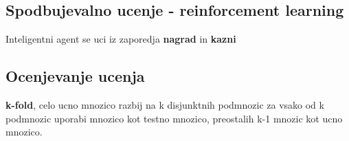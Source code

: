 \subsection{Spodbujevalno ucenje - reinforcement learning}
Inteligentni agent se uci iz zaporedja \textbf{nagrad} in \textbf{kazni}

\subsection{Ocenjevanje ucenja}
\textbf{k-fold}, celo ucno mnozico razbij na k disjunktnih podmnozic za vsako od k podmnozic uporabi mnozico kot testno mnozico, preostalih k-1 mnozic kot ucno mnozico.